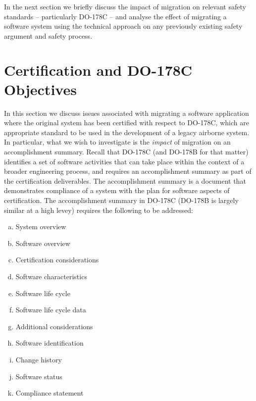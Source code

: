 \documentclass{llncs}
\begin{document}
In the next section we briefly discuss the impact of migration on relevant safety standards -- particularly  DO-178C -- and analyse the effect of migrating
a software system using the technical approach on any previously existing safety argument and safety process.

\section{Certification and DO-178C Objectives}
In this section we discuss issues associated with migrating a software application where the original system has been certified with respect to  DO-178C,
which are appropriate standard to be used in the development of a legacy airborne system. In particular, what we wish to investigate is the \textit{impact}
of migration on an accomplishment summary. Recall that DO-178C (and DO-178B for that matter) identifies a set of software activities that can take place within the context of a broader 
engineering process, and requires an accomplishment summary \cite{DO178C} as part of the certification deliverables. The accomplishment summary is a 
document that demonstrates compliance of a system with the plan for software aspects of certification. The accomplishment summary in
DO-178C (DO-178B is largely similar at a high levey) requires the following to be addressed:

\begin{enumerate}[(a)]
\item System overview
\item Software overview
\item Certification considerations
\item Software characteristics
\item Software life cycle 
\item Software life cycle data
\item Additional considerations
\item Software identification
\item Change history
\item Software status
\item Compliance statement
\end{enumerate}
\end{document}
